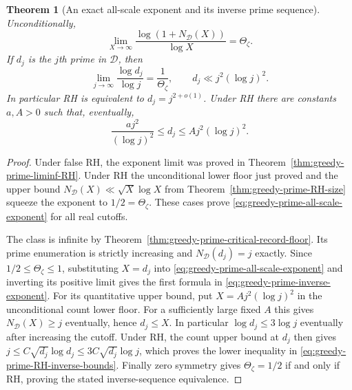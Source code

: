 \documentclass[11pt]{article}
\newtheorem{theorem}{Theorem}[section]
\theoremstyle{definition}
\begin{document}
\begin{theorem}[An exact all-scale exponent and its inverse prime sequence]
\label{thm:greedy-prime-all-scale-exponent}
Unconditionally,
\begin{equation}
 \lim_{X\to\infty}\frac{\log(1+N_{\mathcal D}(X))}{\log X}
       =\Theta_\zeta .
 \label{eq:greedy-prime-all-scale-exponent}
\end{equation}
If $d_j$ is the $j$th prime in $\mathcal D$, then
\begin{equation}
 \lim_{j\to\infty}\frac{\log d_j}{\log j}=\frac1{\Theta_\zeta},
 \qquad
 d_j\ll j^2(\log j)^2 .
 \label{eq:greedy-prime-inverse-exponent}
\end{equation}
In particular RH is equivalent to $d_j=j^{2+o(1)}$.
Under RH there are constants $a,A>0$ such that, eventually,
\begin{equation}
 \frac{a j^2}{(\log j)^2}\le d_j\le A j^2(\log j)^2 .
 \label{eq:greedy-prime-RH-inverse-bounds}
\end{equation}
\end{theorem}

\begin{proof}
Under false RH, the exponent limit was proved in
Theorem~\ref{thm:greedy-prime-liminf-RH}.
Under RH the unconditional lower floor just proved and the
upper bound $N_{\mathcal D}(X)\ll\sqrt X\log X$ from
Theorem~\ref{thm:greedy-prime-RH-size} squeeze the exponent to
$1/2=\Theta_\zeta$. These cases prove
\eqref{eq:greedy-prime-all-scale-exponent} for all real cutoffs.

The class is infinite by
Theorem~\ref{thm:greedy-prime-critical-record-floor}.
Its prime enumeration is strictly increasing and
$N_{\mathcal D}(d_j)=j$ exactly.
Since $1/2\le\Theta_\zeta\le1$, substituting $X=d_j$ into
\eqref{eq:greedy-prime-all-scale-exponent} and inverting its
positive limit gives the first formula in
\eqref{eq:greedy-prime-inverse-exponent}.
For its quantitative upper bound, put
$X=A j^2(\log j)^2$ in the unconditional count lower floor.
For a sufficiently large fixed $A$ this gives
$N_{\mathcal D}(X)\ge j$ eventually, hence $d_j\le X$.
In particular $\log d_j\le3\log j$ eventually after increasing
the cutoff. Under RH, the count upper bound at $d_j$ then gives
$j\le C\sqrt{d_j}\log d_j\le3C\sqrt{d_j}\log j$,
which proves the lower inequality in
\eqref{eq:greedy-prime-RH-inverse-bounds}.
Finally zero symmetry gives
$\Theta_\zeta=1/2$ if and only if RH, proving the stated
inverse-sequence equivalence.
\end{proof}
\end{document}

